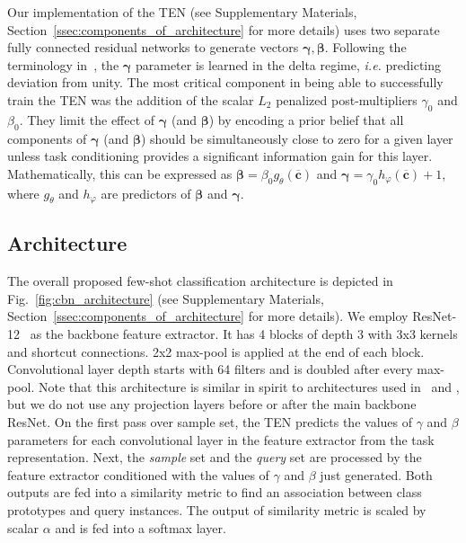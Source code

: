 \documentclass{article}
\renewcommand{\vec}[1]{\mathbf{#1}}
\begin{document}
Our implementation of the TEN (see Supplementary Materials, Section~\ref{ssec:components_of_architecture} for more details) uses two separate fully connected residual networks to generate vectors $\bm{\gamma}, \bm{\beta}$. Following the terminology in~\citep{Perez2017LearningVR}, the $\bm{\gamma}$ parameter is learned in the delta regime, \emph{i.e.} predicting deviation from unity. The most critical component in being able to successfully train the TEN was the addition of the scalar $L_2$ penalized post-multipliers $\gamma_0$ and $\beta_0$. They limit the effect of $\bm{\gamma}$ (and $\bm{\beta}$) by encoding a prior belief that all components of $\bm{\gamma}$  (and $\bm{\beta}$) should be simultaneously close to zero for a given layer unless task conditioning provides a significant information gain for this layer. Mathematically, this can be expressed as $\bm{\beta} = \beta_0 g_{\theta}(\overline{\vec{c}})$ and $\bm{\gamma} = \gamma_0 h_{\varphi}(\overline{\vec{c}}) + 1$, where $g_{\theta}$ and $h_{\varphi}$ are predictors of $\bm{\beta}$ and $\bm{\gamma}$.

\subsection{Architecture} \label{ssec:theory_architecture}

The overall proposed few-shot classification architecture is depicted in Fig.~\ref{fig:cbn_architecture} (see Supplementary Materials, Section~\ref{ssec:components_of_architecture} for more details). We employ ResNet-12~\citep{He2016Deep} as the backbone feature extractor. It has 4 blocks of depth 3 with 3x3 kernels and shortcut connections. 2x2 max-pool is applied at the end of each block. Convolutional layer depth starts with 64 filters and is doubled after every max-pool. Note that this architecture is similar in spirit to architectures used in~\citep{Bauer2017discriminative} and \citep{munkhdalai2018rapid}, but we do not use any projection layers before or after the main backbone ResNet. On the first pass over sample set, the TEN predicts the values of $\gamma$ and $\beta$ parameters for each convolutional layer in the feature extractor from the task representation. Next, the \emph{sample} set and the \emph{query} set are processed by the feature extractor conditioned with the values of $\gamma$ and $\beta$ just generated. Both outputs are fed into a similarity metric to find an association between class prototypes and query instances. The output of similarity metric is scaled by scalar $\alpha$ and is fed into a softmax layer.
\end{document}
